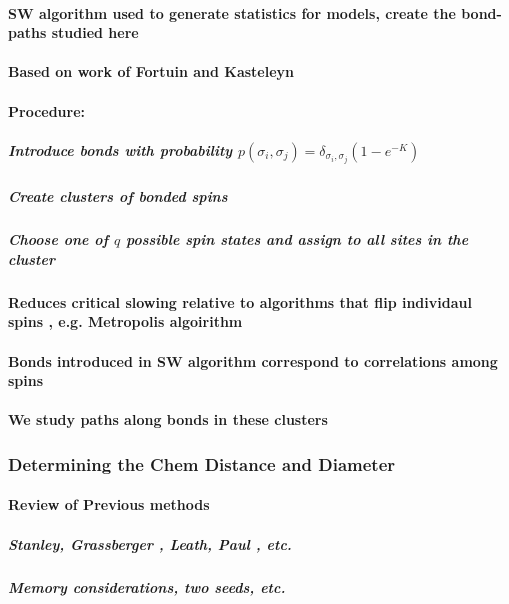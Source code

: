 \documentclass[pre,preprint]{revtex4-1}
\begin{document}
\paragraph{SW algorithm \cite{SwWA} used to generate statistics for models, create the bond-paths studied here}
\label{sec-1.2.1.1}
\paragraph{Based on work of Fortuin and Kasteleyn \cite{FoKa}}
\label{sec-1.2.1.2}
\paragraph{Procedure:}
\label{sec-1.2.1.3}
\subparagraph{Introduce bonds with probability $p(\sigma_i,\sigma_j) = \delta_{\sigma_i, \sigma_j} (1-e^{-K})$}
\label{sec-1.2.1.3.1}
\subparagraph{Create clusters of bonded spins}
\label{sec-1.2.1.3.2}
\subparagraph{Choose one of $q$ possible spin states and assign to all sites in the cluster}
\label{sec-1.2.1.3.3}
\paragraph{Reduces critical slowing relative to algorithms that flip individaul spins \cite{NeBa99}, e.g. Metropolis algoirithm \cite{Met}}
\label{sec-1.2.1.4}
\paragraph{Bonds introduced in SW algorithm correspond to correlations among spins}
\label{sec-1.2.1.5}
\paragraph{We study paths along bonds in these clusters}
\label{sec-1.2.1.6}
\subsubsection{Determining the Chem Distance and Diameter}
\label{sec-1.2.2}
\paragraph{Review of Previous methods}
\label{sec-1.2.2.1}
\subparagraph{Stanley, Grassberger \cite{Gr99}, Leath, Paul \cite{Paul2001}, etc.}
\label{sec-1.2.2.1.1}
\subparagraph{Memory considerations, two seeds, etc.}
\label{sec-1.2.2.1.2}
\end{document}
